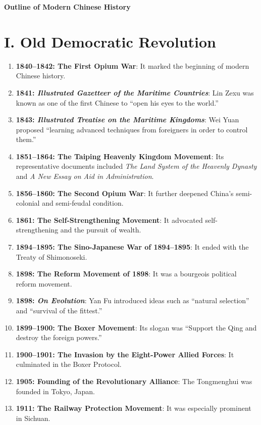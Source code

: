 \documentclass[12pt,a4paper]{ctexart}
\begin{document}
\begin{center}
    {\LARGE \textbf{Outline of Modern Chinese History}}
\end{center}

\section{I. Old Democratic Revolution}

\begin{enumerate}[leftmargin=2em]
    \item \textbf{1840--1842: The First Opium War}: It marked the beginning of modern Chinese history.
    \item \textbf{1841: \textit{Illustrated Gazetteer of the Maritime Countries}}: Lin Zexu was known as one of the first Chinese to ``open his eyes to the world.''
    \item \textbf{1843: \textit{Illustrated Treatise on the Maritime Kingdoms}}: Wei Yuan proposed ``learning advanced techniques from foreigners in order to control them.''
    \item \textbf{1851--1864: The Taiping Heavenly Kingdom Movement}: Its representative documents included \textit{The Land System of the Heavenly Dynasty} and \textit{A New Essay on Aid in Administration}.
    \item \textbf{1856--1860: The Second Opium War}: It further deepened China's semi-colonial and semi-feudal condition.
    \item \textbf{1861: The Self-Strengthening Movement}: It advocated self-strengthening and the pursuit of wealth.
    \item \textbf{1894--1895: The Sino-Japanese War of 1894--1895}: It ended with the Treaty of Shimonoseki.
    \item \textbf{1898: The Reform Movement of 1898}: It was a bourgeois political reform movement.
    \item \textbf{1898: \textit{On Evolution}}: Yan Fu introduced ideas such as ``natural selection'' and ``survival of the fittest.''
    \item \textbf{1899--1900: The Boxer Movement}: Its slogan was ``Support the Qing and destroy the foreign powers.''
    \item \textbf{1900--1901: The Invasion by the Eight-Power Allied Forces}: It culminated in the Boxer Protocol.
    \item \textbf{1905: Founding of the Revolutionary Alliance}: The Tongmenghui was founded in Tokyo, Japan.
    \item \textbf{1911: The Railway Protection Movement}: It was especially prominent in Sichuan.

\end{enumerate}
\end{document}
